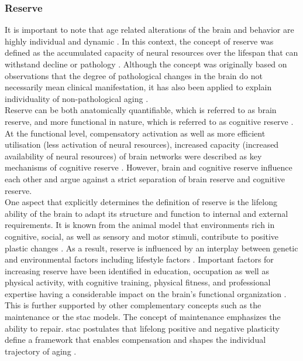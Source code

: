 \subsubsection{Reserve}
\label{theory:aging:reserve}
It is important to note that age related alterations of the brain and behavior are highly individual and dynamic \cite{Smith2020,Koen2019,Douw2014}. In this context, the concept of reserve was defined as the accumulated capacity of neural resources over the lifespan that can withstand decline or pathology \cite{Cabeza2018, Stern2009}. Although the concept was originally based on observations that the degree of pathological changes in the brain do not necessarily mean clinical manifestation, it has also been applied to explain individuality of non-pathological aging \cite{Esiri2001,Cabeza2018,Stern2009}.\\
Reserve can be both anatomically quantifiable, which is referred to as brain reserve, and more functional in nature, which is referred to as cognitive reserve \cite{Stern2009}. At the functional level, compensatory activation as well as more efficient utilisation (less activation of neural resources), increased capacity (increased availability of neural resources) of brain networks were described as key mechanisms of cognitive reserve \cite{Stern2004,Stern2009}. However, brain and cognitive reserve influence each other and \citeauthor{Cabeza2018} \cite{Cabeza2018} argue against a strict separation of brain reserve and cognitive reserve.\\
One aspect that explicitly determines the definition of reserve is the lifelong ability of the brain to adapt its structure and function to internal and external requirements. It is known from the animal model that environments rich in cognitive, social, as well as sensory and motor stimuli, contribute to positive plastic changes \cite{Fabel2009}. As a result, reserve is influenced by an interplay between genetic and environmental factors including lifestyle factors \cite{Cabeza2018}. Important factors for increasing reserve have been identified in education, occupation as well as physical activity, with cognitive training, physical fitness, and professional expertise having a considerable impact on the brain's functional organization \cite{vieluf2018age,VOSS2016113,Soldan2021}.\\
This is further supported by other complementary concepts such as the maintenance or the \gls{stac} models. The concept of maintenance emphasizes the ability to repair. \Gls{stac} postulates that lifelong positive and negative plasticity define a framework that enables compensation and shapes the individual trajectory of aging \cite{Reuter-Lorenz2014}. 

